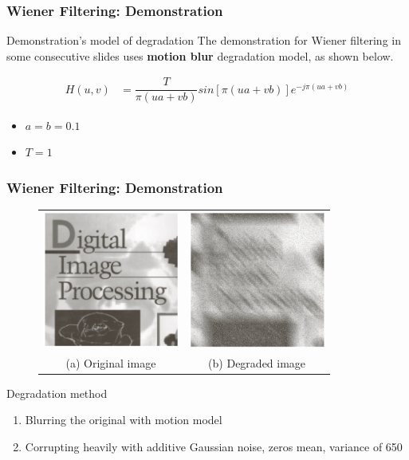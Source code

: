 \documentclass[english,11pt,table,handout]{beamer}
\begin{document}
\frame
{
	\frametitle{Wiener Filtering: Demonstration }
	
	\begin{alertblock}{Demonstration's model of degradation}
		The demonstration for Wiener filtering in some consecutive slides uses \alert{\textbf{motion blur}} degradation model, as shown below.
		
		\begin{align}
			\nonumber
			H(u,v) &= \dfrac{T}{\pi(ua + vb)} sin\left[\pi(ua + vb)\right]e^{-j\pi(ua + vb)}
		\end{align}
		
		\begin{itemize}
			\item $a = b = 0.1$
			\item $T = 1$
		\end{itemize}
	\end{alertblock}
}
\frame
{
	\frametitle{Wiener Filtering: Demonstration }
	
	\begin{figure}[!h]
		\begin{tabular}{cc}
			\includegraphics[height=4.5cm]{book_original.png} &
			\includegraphics[height=4.5cm]{book_degrad_1.png} \\
			(a) Original image & (b) Degraded image\\
		\end{tabular}
	\end{figure}
	\begin{block}{Degradation method}
		\begin{enumerate}
			\item Blurring the original with motion model
			\item Corrupting heavily with additive Gaussian noise, zeros mean, variance of 650
		\end{enumerate}
	\end{block}
}
\end{document}
